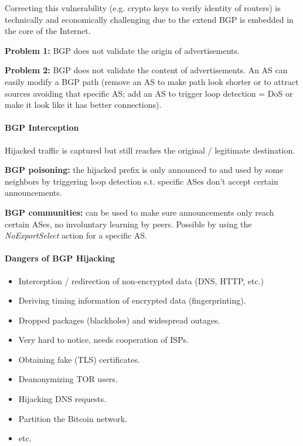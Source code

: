 Correcting this vulnerability (e.g. crypto keys to verify identity of routers) is technically and economically challenging due to the extend BGP is embedded in the core of the Internet.

\textbf{Problem 1:} BGP does not validate the origin of advertisements.

\textbf{Problem 2:} BGP does not validate the content of advertisements. An AS can easily modify a BGP path (remove an AS to make path look shorter or to attract sources avoiding that specific AS; add an AS to trigger loop detection = DoS or make it look like it has better connections).

\paragraph{BGP Interception}
Hijacked traffic is captured but still reaches the original / legitimate destination.

\textbf{BGP poisoning:} the hijacked prefix is only announced to and used by some neighbors by triggering loop detection s.t. specific ASes don't accept certain announcements. %

\textbf{BGP communities:} can be used to make sure announcements only reach certain ASes, no involuntary learning by peers. Possible by using the \textit{NoExportSelect} action for a specific AS.

\paragraph{Dangers of BGP Hijacking}
\begin{itemize}
    \item Interception / redirection of non-encrypted data (DNS, HTTP, etc.)
    \item Deriving timing information of encrypted data (fingerprinting).
    \item Dropped packages (blackholes) and widespread outages.
    \item Very hard to notice, needs cooperation of ISPs.
    \item Obtaining fake (TLS) certificates.
    \item Deanonymizing TOR users.
    \item Hijacking DNS requests.
    \item Partition the Bitcoin network.
    \item etc.
\end{itemize}

